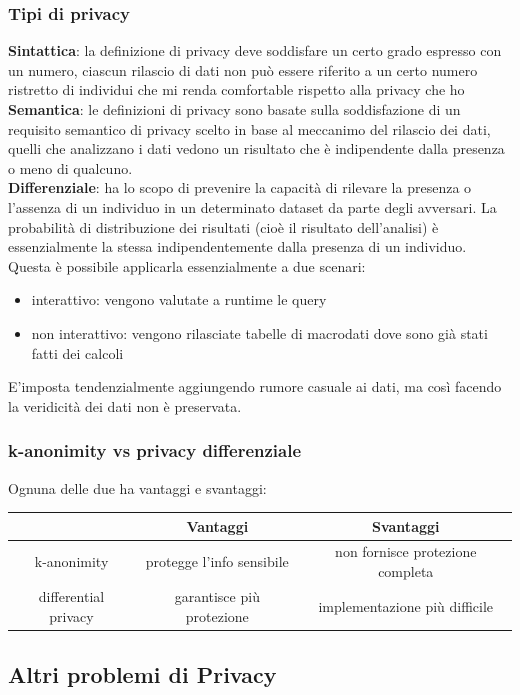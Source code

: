 \subsubsection{Tipi di privacy}
\textbf{Sintattica}: la definizione di privacy deve soddisfare un certo grado espresso con un numero, ciascun rilascio di dati non può essere riferito a un certo numero ristretto di individui che mi renda comfortable rispetto alla privacy che ho\\
\textbf{Semantica}: le definizioni di privacy sono basate sulla soddisfazione di un requisito semantico di privacy scelto in base al meccanimo del rilascio dei dati, quelli che analizzano i dati vedono un risultato che è indipendente dalla presenza o meno di qualcuno.\\
\textbf{Differenziale}: ha lo scopo di prevenire la capacità di rilevare la presenza o l'assenza di un individuo in un determinato dataset da parte degli avversari. La probabilità di distribuzione dei risultati (cioè il risultato dell’analisi) è essenzialmente la stessa indipendentemente dalla presenza di un individuo. Questa è possibile applicarla essenzialmente a due scenari: 
\begin{itemize}
    \item interattivo: vengono valutate a runtime le query
    \item non interattivo: vengono rilasciate tabelle di macrodati dove sono già stati fatti dei calcoli
\end{itemize}
E'imposta tendenzialmente aggiungendo rumore casuale ai dati, ma così facendo la veridicità dei dati non è preservata.

\subsubsection{k-anonimity vs privacy differenziale}
Ognuna delle due ha vantaggi e svantaggi:
\begin{center}
    \begin{tabular}{ |c|c|c| } 
        \hline
        & Vantaggi & Svantaggi  \\
        \hline
        k-anonimity & protegge l'info sensibile & non fornisce protezione completa \\ 
        \hline
        differential privacy & garantisce più protezione & implementazione più difficile \\ 
        \hline
    \end{tabular}
\end{center}
\subsection{Altri problemi di Privacy}
